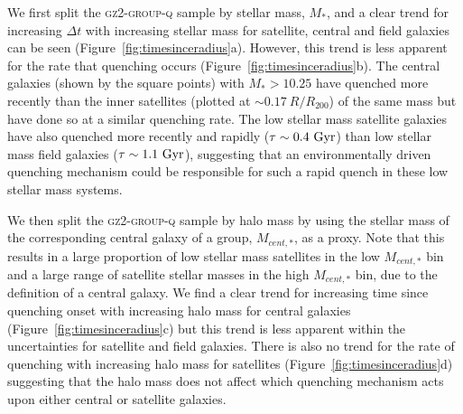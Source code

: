 \documentclass[useAMS,usenatbib]{mn2e}
\begin{document}
We first split the \textsc{gz2-group-q} sample by stellar mass, $M_*$, and a clear trend for increasing $\Delta t$ with increasing stellar mass for satellite, central and field galaxies can be seen (Figure~\ref{fig:timesinceradius}a). However, this trend is less apparent for the rate that quenching occurs (Figure~\ref{fig:timesinceradius}b). The central galaxies (shown by the square points) with $M_* > 10.25$ have quenched more recently than the inner satellites (plotted at $\sim0.17~R/R_{200}$) of the same mass but have done so at a similar quenching rate. The low stellar mass satellite galaxies have also quenched more recently and rapidly ($\tau\sim0.4~\rm{Gyr}$) than low stellar mass field galaxies ($\tau\sim1.1~\rm{Gyr}$), suggesting that an environmentally driven quenching mechanism could be responsible for such a rapid quench in these low stellar mass systems. 

We then split the \textsc{gz2-group-q} sample by halo mass by using the stellar mass of the corresponding central galaxy of a group, $M_{cent,*}$, as a proxy. Note that this results in a large proportion of low stellar mass satellites in the low $M_{cent,*}$ bin and a large range of satellite stellar masses in the high $M_{cent,*}$ bin, due to the definition of a central galaxy. We find a clear trend for increasing time since quenching onset with increasing halo mass for central galaxies (Figure~\ref{fig:timesinceradius}c) but this trend is less apparent within the uncertainties for satellite and field galaxies. There is also no trend for the rate of quenching with increasing halo mass for satellites (Figure~\ref{fig:timesinceradius}d) suggesting that the halo mass does not affect which quenching mechanism acts upon either central or satellite galaxies. 
\end{document}
